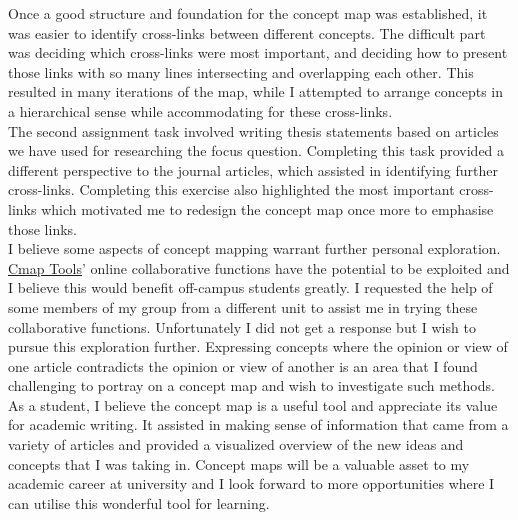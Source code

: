 \documentclass[12pt,a4paper]{report}
\begin{document}
Once a good structure and foundation for the concept map was established, it was easier to identify cross-links between different concepts. The difficult part was deciding which cross-links were most important, and deciding how to present those links with so many lines intersecting and overlapping each other. This resulted in many iterations of the map, while I attempted to arrange concepts in a hierarchical sense while accommodating for these cross-links.\\

The second assignment task involved writing thesis statements based on articles we have used for researching the focus question. Completing this task provided a different perspective to the journal articles, which assisted in identifying further cross-links. Completing this exercise also highlighted the most important cross-links which motivated me to redesign the concept map once more to emphasise those links.\\

I believe some aspects of concept mapping warrant further personal exploration. \href{http://cmap.ihmc.us/}{Cmap Tools}' online collaborative functions have the potential to be exploited and I believe this would benefit off-campus students greatly. I requested the help of some members of my group from a different unit to assist me in trying these collaborative functions. Unfortunately I did not get a response but I wish to pursue this exploration further. Expressing concepts where the opinion or view of one article contradicts the opinion or view of another is an area that I found challenging to portray on a concept map and wish to investigate such methods.\\

As a student, I believe the concept map is a useful tool and appreciate its value for academic writing. It assisted in making sense of information that came from a variety of articles and provided a visualized overview of the new ideas and concepts that I was taking in. Concept maps will be a valuable asset to my academic career at university and I look forward to more opportunities where I can utilise this wonderful tool for learning.

\newpage
{}


\end{document}
